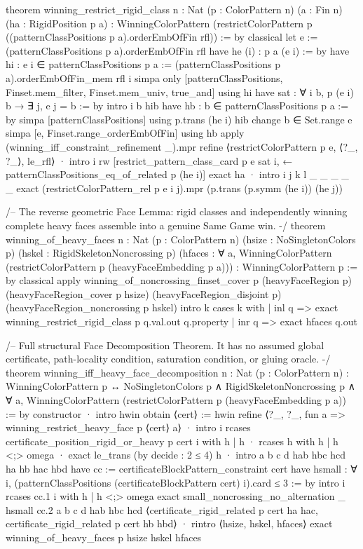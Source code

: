\documentclass[11pt,reqno]{amsart}
\theoremstyle{definition}
\begin{document}
\begin{LeanCode}
theorem winning_restrict_rigid_class {n : Nat} (p : ColorPattern n)
    (a : Fin n) (ha : RigidPosition p a) :
    WinningColorPattern (restrictColorPattern p
      ((patternClassPositions p a).orderEmbOfFin rfl)) := by
  classical
  let e := (patternClassPositions p a).orderEmbOfFin rfl
  have he (i) : p a (e i) := by
    have hi : e i ∈ patternClassPositions p a :=
      (patternClassPositions p a).orderEmbOfFin_mem rfl i
    simpa only [patternClassPositions, Finset.mem_filter,
      Finset.mem_univ, true_and] using hi
  have sat : ∀ i b, p (e i) b → ∃ j, e j = b := by
    intro i b hib
    have hb : b ∈ patternClassPositions p a := by
      simpa [patternClassPositions] using p.trans (he i) hib
    change b ∈ Set.range e
    simpa [e, Finset.range_orderEmbOfFin] using hb
  apply (winning_iff_constraint_refinement _).mpr
  refine ⟨restrictColorPattern p e, ⟨?_, ?_⟩, le_rfl⟩
  · intro i
    rw [restrict_pattern_class_card p e sat i,
      ← patternClassPositions_eq_of_related p (he i)]
    exact ha
  · intro i j k l _ _ _ _ _
    exact (restrictColorPattern_rel p e i j).mpr (p.trans (p.symm (he i)) (he j))

/-- The reverse geometric Face Lemma: rigid classes and independently
winning complete heavy faces assemble into a genuine Same Game win. -/
theorem winning_of_heavy_faces {n : Nat} (p : ColorPattern n)
    (hsize : NoSingletonColors p) (hskel : RigidSkeletonNoncrossing p)
    (hfaces : ∀ a, WinningColorPattern
      (restrictColorPattern p (heavyFaceEmbedding p a))) : WinningColorPattern p := by
  classical
  apply winning_of_noncrossing_finset_cover p (heavyFaceRegion p)
    (heavyFaceRegion_cover p hsize) (heavyFaceRegion_disjoint p)
    (heavyFaceRegion_noncrossing p hskel)
  intro k
  cases k with
  | inl q => exact winning_restrict_rigid_class p q.val.out q.property
  | inr q => exact hfaces q.out

/-- Full structural Face Decomposition Theorem. It has no assumed global
certificate, path-locality condition, saturation condition, or gluing oracle. -/
theorem winning_iff_heavy_face_decomposition {n : Nat} (p : ColorPattern n) :
    WinningColorPattern p ↔ NoSingletonColors p ∧ RigidSkeletonNoncrossing p ∧
      ∀ a, WinningColorPattern (restrictColorPattern p (heavyFaceEmbedding p a)) := by
  constructor
  · intro hwin
    obtain ⟨cert⟩ := hwin
    refine ⟨?_, ?_, fun a => winning_restrict_heavy_face p ⟨cert⟩ a⟩
    · intro i
      rcases certificate_position_rigid_or_heavy p cert i with h | h
      · rcases h with h | h <;> omega
      · exact le_trans (by decide : 2 ≤ 4) h
    · intro a b c d hab hbc hcd ha hb hac hbd
      have cc := certificateBlockPattern_constraint cert
      have hsmall : ∀ i, (patternClassPositions (certificateBlockPattern cert) i).card ≤ 3 := by
        intro i
        rcases cc.1 i with h | h <;> omega
      exact small_noncrossing_no_alternation _ hsmall cc.2 a b c d hab hbc hcd
        ⟨certificate_rigid_related p cert ha hac, certificate_rigid_related p cert hb hbd⟩
  · rintro ⟨hsize, hskel, hfaces⟩
    exact winning_of_heavy_faces p hsize hskel hfaces


\end{LeanCode}
\end{document}
